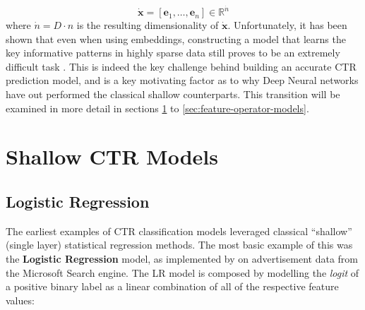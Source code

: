 \documentclass{mldsmsc}
\begin{document}
\begin{equation*}
    \dot{\mathbf{x}} = \left[ \mathbf{e}_1, \dots , \mathbf{e}_n\right]
    \in \mathbb{R}^{\dot{n}}
\end{equation*}
where $\dot{n} = D\cdot n$
is the resulting dimensionality of $\dot{\mathbf{x}}$. Unfortunately, it has been shown that
even when using embeddings, constructing a model that learns the key informative patterns
in highly sparse data still proves to be an extremely difficult task \citep{RefWorks:gu2021ad,RefWorks:zhang2021deep}.
This is indeed the key challenge behind building an
accurate CTR prediction model, and is a key motivating factor as to why Deep Neural
networks have out performed the classical shallow counterparts. This transition will be examined
in more detail in sections \ref{sec:shallow-models} to \ref{sec:feature-operator-models}.

\section{Shallow CTR Models}
\label{sec:shallow-models}

\subsection{Logistic Regression}

The earliest examples of CTR classification models leveraged classical ``shallow'' 
(single layer) statistical regression methods. The most basic example of this was 
the \textbf{Logistic Regression} model, as implemented by \cite{RefWorks:richardson2007predicting} on
advertisement data from the Microsoft Search engine. The LR model
is composed by modelling the \emph{logit}
of a positive binary label as a linear combination
of all of the respective feature values:
\end{document}
